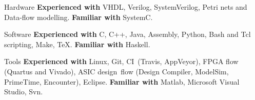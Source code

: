 
\vspace{-1mm}
\begin{cvskills}

\cvskill
{Hardware}
{\textbf{Experienced with} VHDL, Verilog, SystemVerilog, Petri nets and 
Data-flow modelling. \textbf{Familiar with} SystemC.}

\cvskill
{Software}
{\textbf{Experienced with} C, C++, Java, Assembly, Python, Bash and Tcl 
scripting, Make, TeX. \textbf{Familiar with} Haskell.}

\cvskill
{Tools}
{\textbf{Experienced with} Linux, Git, CI~(Travis, AppVeyor), FPGA 
flow (Quartus and Vivado), ASIC design~flow (Design Compiler, ModelSim, 
PrimeTime, Encounter), Eclipse. \textbf{Familiar with} Matlab, 
Microsoft Visual Studio, Svn.}

\end{cvskills}
\vspace{-2mm}

